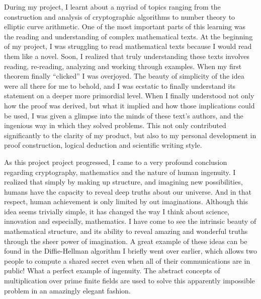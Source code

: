 \documentclass[12pt, a4paper, draft]{report}
\begin{document}
During my project, I learnt about a myriad of topics ranging from
the construction and analysis of cryptographic algorithms to number theory
to elliptic curve arithmetic. One of the most important parts of this learning
was the reading and understanding of complex mathematical texts. At the
beginning of my project, I was struggling to read mathematical texts because
I would read them like a novel. Soon, I realized that truly understanding
these texts involves reading, re-reading, analyzing and working through
examples. When my first theorem finally ``clicked'' I was overjoyed. The
beauty of simplicity of the idea were all there for me to behold, and I was
ecstatic to finally understand its statement on a deeper more primordial level.
When I finally understood not only how the proof was derived, but what it
implied and how those implications could be used, I was given a glimpse
into the minds of these text's authors, and the ingenious way in which they
solved problems. This not only contributed significantly to the clarity of my
product, but also to my personal development in proof construction, logical
deduction and scientific writing style.

As this project project progressed, I came to a very profound
conclusion regarding cryptography, mathematics and the nature of
human ingenuity. I realized that simply by making up structure, and
imagining new possibilities, humans have the capacity to reveal
deep truths about our universe. And in that respect, human achievement
is only limited by out imaginations. Although this idea seems trivially
simple, it has changed the way I think about science, innovation and
especially, mathematics. I have come to see the intrinsic beauty of
mathematical structure, and its ability to reveal amazing and wonderful
truths through the sheer power of imagination. A great example of these ideas
can be found in the Diffie-Hellman algorithm I briefly went over earlier,
which allows two people to compute a shared secret even when all of their
communications are in public! What a perfect example of ingenuity. The
abstract concepts of multiplication over prime finite fields are used
to solve this apparently impossible problem in an amazingly elegant fashion.
\end{document}
